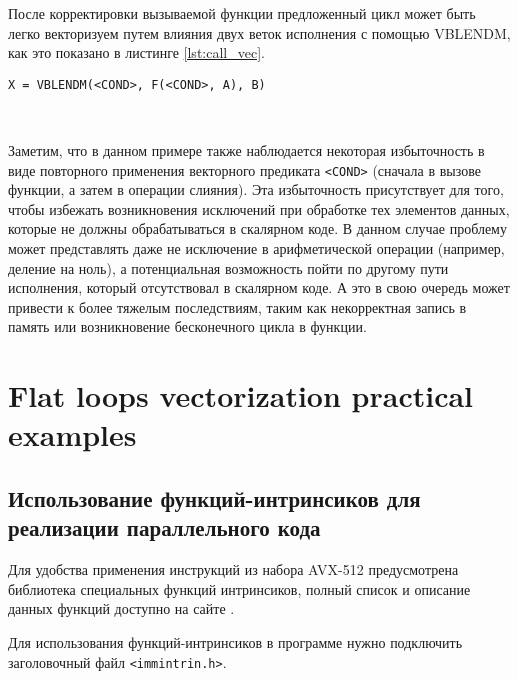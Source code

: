 \documentclass[
11pt,%
tightenlines,%
twoside,%
onecolumn,%
nofloats,%
nobibnotes,%
nofootinbib,%
superscriptaddress,%
noshowpacs,%
centertags]%
{revtex4}
\begin{document}
После корректировки вызываемой функции предложенный цикл может быть легко векторизуем путем влияния двух веток исполнения с помощью VBLENDM, как это показано в листинге \ref{lst:call_vec}.

\begin{lstlisting}[caption={Векторизация плоского цикла с вызовом функции под условием},label={lst:call_vec}]
X = VBLENDM(<COND>, F(<COND>, A), B)

\end{lstlisting}

\

Заметим, что в данном примере также наблюдается некоторая избыточность в виде повторного применения векторного предиката \texttt{<COND>} (сначала в вызове функции, а затем в операции слияния).
Эта избыточность присутствует для того, чтобы избежать возникновения исключений при обработке тех элементов данных, которые не должны обрабатываться в скалярном коде.
В данном случае проблему может представлять даже не исключение в арифметической операции (например, деление на ноль), а потенциальная возможность пойти по другому пути исполнения, который отсутствовал в скалярном коде.
А это в свою очередь может привести к более тяжелым последствиям, таким как некорректная запись в память или возникновение бесконечного цикла в функции.

\section{Flat loops vectorization practical examples}

\subsection{Использование функций-интринсиков для реализации параллельного кода}

Для удобства применения инструкций из набора AVX-512 предусмотрена библиотека специальных функций интринсиков, полный список и описание данных функций доступно на сайте \cite{Intel_Intr}.

Для использования функций-интринсиков в программе нужно подключить заголовочный файл \texttt{<immintrin.h>}.
\end{document}
